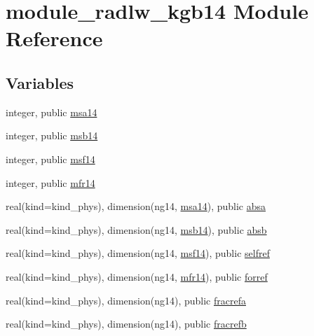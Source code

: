 \hypertarget{namespacemodule__radlw__kgb14}{}\section{module\+\_\+radlw\+\_\+kgb14 Module Reference}
\label{namespacemodule__radlw__kgb14}
\subsection*{Variables}
\begin{DoxyCompactItemize}
\item 
integer, public \hyperlink{namespacemodule__radlw__kgb14_a9357fbaa5663438f0c0062a45c99a8d4}{msa14}
\item 
integer, public \hyperlink{group__module__radlw__main_ga2d400a2aa969f2b2b6efd15555b67159}{msb14}
\item 
integer, public \hyperlink{group__module__radlw__main_ga37c15d52e45cd6b36dc246a059b0c5ca}{msf14}
\item 
integer, public \hyperlink{group__module__radlw__main_ga52354badbce95c005b19bd5a443fd488}{mfr14}
\item 
real(kind=kind\+\_\+phys), dimension(ng14, \hyperlink{namespacemodule__radlw__kgb14_a9357fbaa5663438f0c0062a45c99a8d4}{msa14}), public \hyperlink{group__module__radlw__main_gab57cb029ede27280bc99641f39ab3a81}{absa}
\item 
real(kind=kind\+\_\+phys), dimension(ng14, \hyperlink{group__module__radlw__main_ga2d400a2aa969f2b2b6efd15555b67159}{msb14}), public \hyperlink{group__module__radlw__main_gaa7a122319c49f3c1e8d51d21771cb63d}{absb}
\item 
real(kind=kind\+\_\+phys), dimension(ng14, \hyperlink{group__module__radlw__main_ga37c15d52e45cd6b36dc246a059b0c5ca}{msf14}), public \hyperlink{group__module__radlw__main_ga0e390a41b1c9e2ece765d65774060bca}{selfref}
\item 
real(kind=kind\+\_\+phys), dimension(ng14, \hyperlink{group__module__radlw__main_ga52354badbce95c005b19bd5a443fd488}{mfr14}), public \hyperlink{group__module__radlw__main_ga8478067cb8a07a02b56c09fa3c73eb67}{forref}
\item 
real(kind=kind\+\_\+phys), dimension(ng14), public \hyperlink{group__module__radlw__main_gae1e7065b9ea30b36a3665ad594545e9b}{fracrefa}
\item 
real(kind=kind\+\_\+phys), dimension(ng14), public \hyperlink{group__module__radlw__main_ga13a211bf8a903d0720fa72ac90e4fc3f}{fracrefb}
\end{DoxyCompactItemize}


